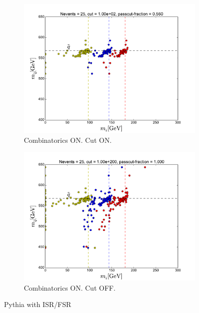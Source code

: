 \documentclass[twoside,english]{uiofysmaster}
\begin{document}
\begin{figure}[hbt]
	\begin{subfigure}[b]{0.49\textwidth}
		\includegraphics[width=\textwidth]{figures/making-sense/pythia_combinatorics-ON_cut-100.pdf} 
		\caption{Combinatorics ON. Cut ON.}
	\end{subfigure}
	\begin{subfigure}[b]{0.49\textwidth}
		\includegraphics[width=\textwidth]{figures/making-sense/pythia_combinatorics-ON_nocut.pdf} 
		\caption{Combinatorics ON. Cut OFF.}
	\end{subfigure}
	\caption{Pythia with ISR/FSR}
\end{figure}
\end{document}
